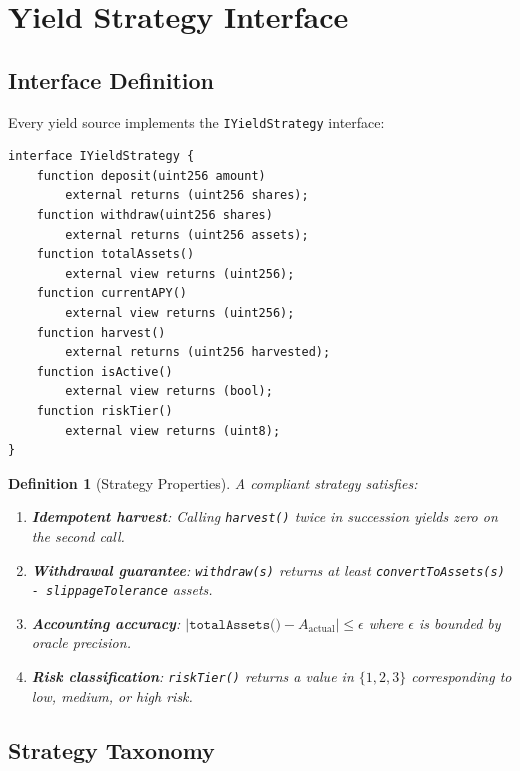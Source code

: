 \documentclass[11pt,twocolumn]{article}
\newtheorem{definition}{Definition}[section]
\begin{document}
\section{Yield Strategy Interface}\label{sec:strategies}

\subsection{Interface Definition}

Every yield source implements the \texttt{IYieldStrategy} interface:

\begin{lstlisting}[language=Solidity,caption=IYieldStrategy interface]
interface IYieldStrategy {
    function deposit(uint256 amount)
        external returns (uint256 shares);
    function withdraw(uint256 shares)
        external returns (uint256 assets);
    function totalAssets()
        external view returns (uint256);
    function currentAPY()
        external view returns (uint256);
    function harvest()
        external returns (uint256 harvested);
    function isActive()
        external view returns (bool);
    function riskTier()
        external view returns (uint8);
}
\end{lstlisting}

\begin{definition}[Strategy Properties]
A compliant strategy satisfies:
\begin{enumerate}[nosep]
  \item \textbf{Idempotent harvest}: Calling \texttt{harvest()} twice in succession yields zero on the second call.
  \item \textbf{Withdrawal guarantee}: \texttt{withdraw(s)} returns at least \texttt{convertToAssets(s) - slippageTolerance} assets.
  \item \textbf{Accounting accuracy}: $|\texttt{totalAssets()} - A_{\text{actual}}| \leq \epsilon$ where $\epsilon$ is bounded by oracle precision.
  \item \textbf{Risk classification}: \texttt{riskTier()} returns a value in $\{1, 2, 3\}$ corresponding to low, medium, or high risk.
\end{enumerate}
\end{definition}

\subsection{Strategy Taxonomy}\label{sec:taxonomy}
\end{document}

